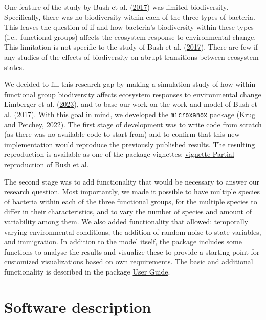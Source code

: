 \documentclass[
]{article}
\begin{document}
One feature of the study by Bush et al. (\protect\hyperlink{ref-Bush2017}{2017}) was limited biodiversity. Specifically, there was no biodiversity within each of the three types of bacteria. This leaves the question of if and how bacteria's biodiversity within these types (i.e., functional groups) affects the ecosystem response to environmental change. This limitation is not specific to the study of Bush et al. (\protect\hyperlink{ref-Bush2017}{2017}). There are few if any studies of the effects of biodiversity on abrupt transitions between ecosystem states.

We decided to fill this research gap by making a simulation study of how within functional group biodiversity affects ecosystem responses to environmental change Limberger et al. (\protect\hyperlink{ref-Limberger2022}{2023}), and to base our work on the work and model of Bush et al. (\protect\hyperlink{ref-Bush2017}{2017}). With this goal in mind, we developed the \texttt{microxanox} package (\protect\hyperlink{ref-Krug2022}{Krug and Petchey, 2022}). The first stage of development was to write code from scratch (as there was no available code to start from) and to confirm that this new implementation would reproduce the previously published results. The resulting reproduction is available as one of the package vignettes: \href{https://uzh-peg.r-universe.dev/articles/microxanox/partial-reproduction-Bushetal2017.html}{vignette Partial reproduction of Bush et al}.

The second stage was to add functionality that would be necessary to answer our research question. Most importantly, we made it possible to have multiple species of bacteria within each of the three functional groups, for the multiple species to differ in their characteristics, and to vary the number of species and amount of variability among them. We also added functionality that allowed: temporally varying environmental conditions, the addition of random noise to state variables, and immigration. In addition to the model itself, the package includes some functions to analyse the results and visualize these to provide a starting point for customized visualizations based on own requirements. The basic and additional functionality is described in the package \href{https://uzh-peg.r-universe.dev/articles/microxanox/User-guide.html}{User Guide}.

\hypertarget{software-description}{%
\section{Software description}\label{software-description}}
\end{document}
